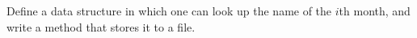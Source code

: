 Define a data structure in which one can look up the name of the $i$th month, and write a method that stores it to a file.
